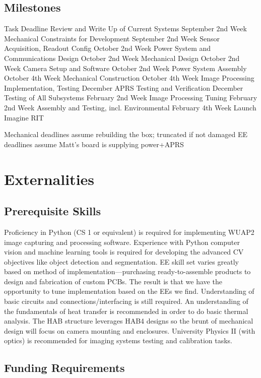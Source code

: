 \documentclass[conference]{IEEEtran} %
\begin{document}
\subsection{Milestones}

Task
Deadline
Review and Write Up of Current Systems
September 2nd Week
Mechanical Constraints for Development
September 2nd Week
Sensor Acquisition, Readout Config
October 2nd Week
Power System and Communications Design
October 2nd Week
Mechanical Design
October 2nd Week
Camera Setup and Software
October 2nd Week
Power System Assembly
October 4th Week
Mechanical Construction
October 4th Week
Image Processing Implementation, Testing
December
APRS Testing and Verification
December
Testing of All Subsystems
February 2nd Week
Image Processing Tuning
February 2nd Week
Assembly and Testing, incl. Environmental
February 4th Week
Launch
Imagine RIT


Mechanical deadlines assume rebuilding the box; truncated if not damaged
EE deadlines assume Matt's board is supplying power+APRS

\section{Externalities}
\subsection{Prerequisite Skills}
Proficiency in Python (CS 1 or equivalent) is required for implementing WUAP2 image capturing and processing software. 
Experience with Python computer vision and machine learning tools is required for developing the advanced CV objectives like object detection and segmentation. 
EE skill set varies greatly based on method of implementation---purchasing ready-to-assemble products to design and fabrication of custom PCBs. 
The result is that we have the opportunity to tune implementation based on the EEs we find. 
Understanding of basic circuits and connections/interfacing is still required. 
An understanding of the fundamentals of heat transfer is recommended in order to do basic thermal analysis. 
The HAB structure leverages HAB4 designs so the brunt of mechanical design will focus on camera mounting and enclosures. 
University Physics II (with optics) is recommended for imaging systems testing and calibration tasks.

\subsection{Funding Requirements}
\end{document}
